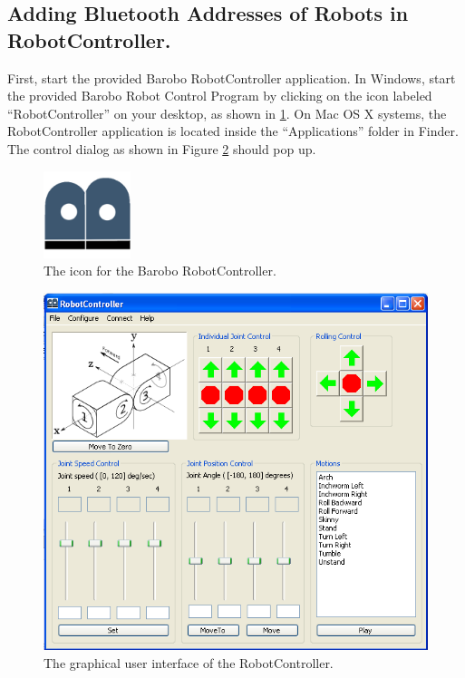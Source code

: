 \documentclass{article}
\begin{document}
\subsection{\label{sec:pairing_robotcontroller} Adding Bluetooth Addresses of Robots in RobotController.}
First, start the provided Barobo RobotController application.
In Windows, start the provided Barobo Robot Control Program by clicking on the icon labeled 
``RobotController'' on your desktop, as shown in \ref{fig:barobo_icon.png}. On Mac OS X systems,
the RobotController application is located inside the ``Applications'' folder in Finder. The 
control dialog as shown in Figure \ref{fig:shot1.png} should pop up.
\begin{figure}[H]
\begin{center}
\includegraphics[width=1in]{images/barobo_icon.png}
\end{center}
\caption{\label{fig:barobo_icon.png} The icon for the Barobo RobotController.}
\end{figure}

\begin{figure}[H]
\begin{center}
\includegraphics[width=4.5in]{images/shot1.png}
\end{center}
\caption{\label{fig:shot1.png} The graphical user interface of the RobotController.}
\end{figure}
\end{document}
